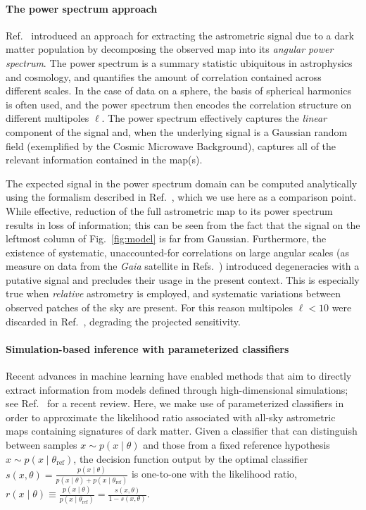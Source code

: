 \documentclass[]{article}
\begin{document}
\paragraph{The power spectrum approach} Ref.~\cite{Mishra-Sharma:2020ynk} introduced an approach for extracting the astrometric signal due to a dark matter population by decomposing the observed map into its \emph{angular power spectrum}. The power spectrum is a summary statistic ubiquitous in astrophysics and cosmology, and quantifies the amount of correlation contained across different scales. In the case of data on a sphere, the basis of spherical harmonics is often used, and the power spectrum then encodes the correlation structure on different multipoles $\ell$. The power spectrum effectively captures the \emph{linear} component of the signal and, when the underlying signal is a Gaussian random field (exemplified by the Cosmic Microwave Background), captures all of the relevant information contained in the map(s).

The expected signal in the power spectrum domain can be computed analytically using the formalism described in Ref.~\cite{Mishra-Sharma:2020ynk}, which we use here as a comparison point. While effective, reduction of the full astrometric map to its power spectrum results in loss of information; this can be seen from the fact that the signal on the leftmost column of Fig.~\ref{fig:model} is far from Gaussian. Furthermore, the existence of systematic, unaccounted-for correlations on large angular scales (as measure on data from the \emph{Gaia} satellite in Refs.~\cite{}) introduced degeneracies with a putative signal and precludes their usage in the present context. This is especially true when \emph{relative} astrometry is employed, and systematic variations between observed patches of the sky are present. For this reason multipoles $\ell < 10$ were discarded in Ref.~\cite{Mishra-Sharma:2020ynk}, degrading the projected sensitivity.

\paragraph{Simulation-based inference with parameterized classifiers} Recent advances in machine learning have enabled methods that aim to directly extract information from models defined through high-dimensional simulations; see Ref.~\cite{Cranmer:2019eaq} for a recent review. Here, we make use of parameterized classifiers in order to approximate the likelihood ratio associated with all-sky astrometric maps containing signatures of dark matter. Given a classifier that can distinguish between samples $x \sim p(x\mid\theta)$ and those from a fixed reference hypothesis $x \sim p(x\mid\theta_\mathrm{ref})$, the decision function output by the optimal classifier $s(x, \theta) = \frac{p(x\mid\theta)}{p(x\mid\theta) + p(x\mid\theta_\mathrm{ref})}$ is one-to-one with the likelihood ratio, $r(x\mid \theta) \equiv \frac{p(x\mid\theta)}{p(x\mid\theta_\mathrm{ref})}  = \frac{s(x, \theta)}{1 - s(x, \theta)}$. 
\end{document}
